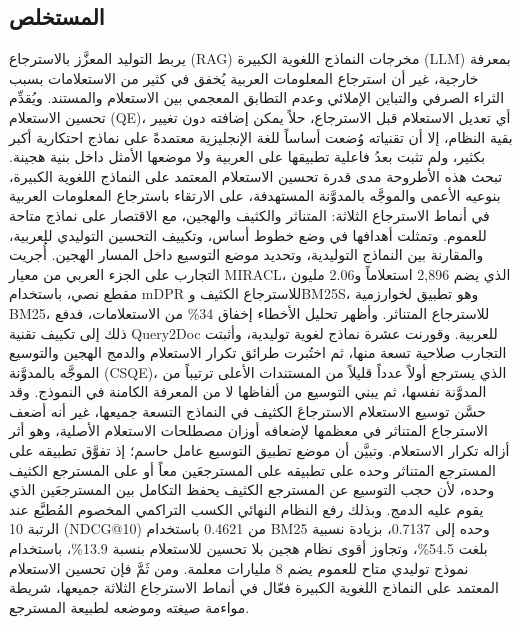 \begin{Arabic}
\chapter*{المستخلص}

يربط التوليد المعزَّز بالاسترجاع (RAG) مخرجات النماذج اللغوية الكبيرة (LLM) بمعرفة خارجية، غير أن استرجاع المعلومات العربية يُخفق في كثير من الاستعلامات بسبب الثراء الصرفي والتباين الإملائي وعدم التطابق المعجمي بين الاستعلام والمستند. ويُقدِّم تحسين الاستعلام (QE)، أي تعديل الاستعلام قبل الاسترجاع، حلاً يمكن إضافته دون تغيير بقية النظام، إلا أن تقنياته وُضعت أساساً للغة الإنجليزية معتمدةً على نماذج احتكارية أكبر بكثير، ولم تثبت بعدُ فاعلية تطبيقها على العربية ولا موضعها الأمثل داخل بنية هجينة. تبحث هذه الأطروحة مدى قدرة تحسين الاستعلام المعتمد على النماذج اللغوية الكبيرة، بنوعيه الأعمى والموجَّه بالمدوَّنة المستهدفة، على الارتقاء باسترجاع المعلومات العربية في أنماط الاسترجاع الثلاثة: المتناثر والكثيف والهجين، مع الاقتصار على نماذج متاحة للعموم. وتمثلت أهدافها في وضع خطوط أساس، وتكييف التحسين التوليدي للعربية، والمقارنة بين النماذج التوليدية، وتحديد موضع التوسيع داخل المسار الهجين. أُجريت التجارب على الجزء العربي من معيار MIRACL، الذي يضم 2,896 استعلاماً و2.06 مليون مقطع نصي، باستخدام mDPR للاسترجاع الكثيف وBM25S، وهو تطبيق لخوارزمية BM25، للاسترجاع المتناثر. وأظهر تحليل الأخطاء إخفاق 34\% من الاستعلامات، فدفع ذلك إلى تكييف تقنية Query2Doc للعربية. وقورنت عشرة نماذج لغوية توليدية، وأثبتت التجارب صلاحية تسعة منها، ثم اختُبرت طرائق تكرار الاستعلام والدمج الهجين والتوسيع الموجَّه بالمدوَّنة (CSQE)، الذي يسترجع أولاً عدداً قليلاً من المستندات الأعلى ترتيباً من المدوَّنة نفسها، ثم يبني التوسيع من ألفاظها لا من المعرفة الكامنة في النموذج. وقد حسَّن توسيع الاستعلام الاسترجاعَ الكثيف في النماذج التسعة جميعها، غير أنه أضعف الاسترجاع المتناثر في معظمها لإضعافه أوزان مصطلحات الاستعلام الأصلية، وهو أثر أزاله تكرار الاستعلام. وتبيَّن أن موضع تطبيق التوسيع عامل حاسم؛ إذ تفوَّق تطبيقه على المسترجع المتناثر وحده على تطبيقه على المسترجعَين معاً أو على المسترجع الكثيف وحده، لأن حجب التوسيع عن المسترجع الكثيف يحفظ التكامل بين المسترجعَين الذي يقوم عليه الدمج. وبذلك رفع النظام النهائي الكسب التراكمي المخصوم المُطبَّع عند الرتبة 10 (NDCG@10) من 0.4621 باستخدام BM25 وحده إلى 0.7137، بزيادة نسبية بلغت 54.5\%، وتجاوز أقوى نظام هجين بلا تحسين للاستعلام بنسبة 13.9\%، باستخدام نموذج توليدي متاح للعموم يضم 8 مليارات معلمة. ومن ثَمَّ فإن تحسين الاستعلام المعتمد على النماذج اللغوية الكبيرة فعّال في أنماط الاسترجاع الثلاثة جميعها، شريطة مواءمة صيغته وموضعه لطبيعة المسترجع.
\end{Arabic}
